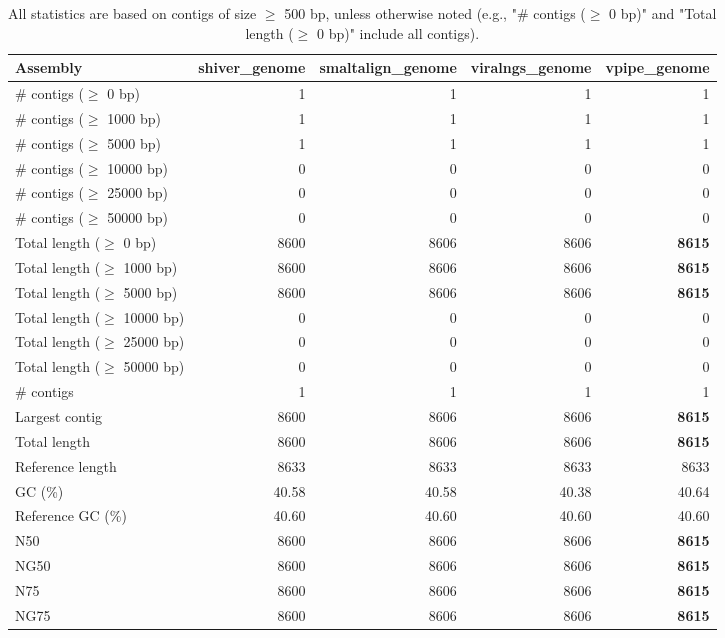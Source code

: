 \documentclass[12pt,a4paper]{article}
\begin{document}
\begin{table}[ht]
\begin{center}
\caption{All statistics are based on contigs of size $\geq$ 500 bp, unless otherwise noted (e.g., "\# contigs ($\geq$ 0 bp)" and "Total length ($\geq$ 0 bp)" include all contigs).}
\begin{tabular}{|l*{4}{|r}|}
\hline
Assembly & shiver\_genome & smaltalign\_genome & viralngs\_genome & vpipe\_genome \\ \hline
\# contigs ($\geq$ 0 bp) & 1 & 1 & 1 & 1 \\ \hline
\# contigs ($\geq$ 1000 bp) & 1 & 1 & 1 & 1 \\ \hline
\# contigs ($\geq$ 5000 bp) & 1 & 1 & 1 & 1 \\ \hline
\# contigs ($\geq$ 10000 bp) & 0 & 0 & 0 & 0 \\ \hline
\# contigs ($\geq$ 25000 bp) & 0 & 0 & 0 & 0 \\ \hline
\# contigs ($\geq$ 50000 bp) & 0 & 0 & 0 & 0 \\ \hline
Total length ($\geq$ 0 bp) & 8600 & 8606 & 8606 & {\bf 8615} \\ \hline
Total length ($\geq$ 1000 bp) & 8600 & 8606 & 8606 & {\bf 8615} \\ \hline
Total length ($\geq$ 5000 bp) & 8600 & 8606 & 8606 & {\bf 8615} \\ \hline
Total length ($\geq$ 10000 bp) & 0 & 0 & 0 & 0 \\ \hline
Total length ($\geq$ 25000 bp) & 0 & 0 & 0 & 0 \\ \hline
Total length ($\geq$ 50000 bp) & 0 & 0 & 0 & 0 \\ \hline
\# contigs & 1 & 1 & 1 & 1 \\ \hline
Largest contig & 8600 & 8606 & 8606 & {\bf 8615} \\ \hline
Total length & 8600 & 8606 & 8606 & {\bf 8615} \\ \hline
Reference length & 8633 & 8633 & 8633 & 8633 \\ \hline
GC (\%) & 40.58 & 40.58 & 40.38 & 40.64 \\ \hline
Reference GC (\%) & 40.60 & 40.60 & 40.60 & 40.60 \\ \hline
N50 & 8600 & 8606 & 8606 & {\bf 8615} \\ \hline
NG50 & 8600 & 8606 & 8606 & {\bf 8615} \\ \hline
N75 & 8600 & 8606 & 8606 & {\bf 8615} \\ \hline
NG75 & 8600 & 8606 & 8606 & {\bf 8615} \\ \hline

\end{tabular}
\end{center}
\end{table}
\end{document}
